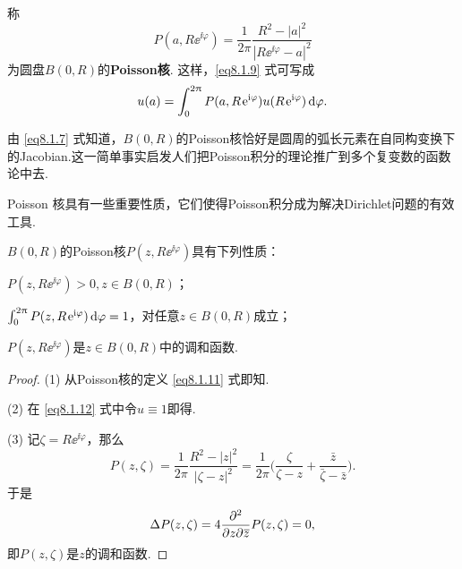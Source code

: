称
\begin{equation}\label{eq8.1.11}
  P(a,R\ee^{\ii\varphi}) = \frac1{2\pi}\frac{R^2-|a|^2}{|R\ee^{\ii\varphi}-a|^2}
\end{equation}
为圆盘$B(0,R)$的\textbf{Poisson核}. 这样，\eqref{eq8.1.9} 式可写成
\begin{equation}\label{eq8.1.12}
  u(a) = \int_0^{2\uppi}P(a,R\operatorname{\!\!\;\mathrm e}^{\mathrm i\varphi})u(R\operatorname{\!\!\;\mathrm e}^{\mathrm i\varphi})\mathop{}\!\mathrm{d} \varphi.
\end{equation}

由 \eqref{eq8.1.7} 式知道，$B(0,R)$的Poisson核恰好是圆周的弧长元素在自同构变换下的Jacobian.这一简单事实启发人们把Poisson积分的理论推广到多个复变数的函数论中去.

Poisson 核具有一些重要性质，它们使得Poisson积分成为解决Dirichlet问题的有效工具.

\begin{prop}\label{prop8.1.6}
  $B(0,R)$的Poisson核$P(z,R\ee^{\ii\varphi})$具有下列性质：
  \begin{eenum}
    \item \label{prop8.1.6.1} $P(z,R\ee^{\ii\varphi})>0,z\in B(0,R)$；
    \item \label{prop8.1.6.2} $\int_0^{2\uppi}P(z,R\operatorname{\!\!\;\mathrm e}^{\mathrm i\varphi})\mathop{}\!\mathrm{d} \varphi=1$，对任意$z\in B(0,R)$成立；
    \item \label{prop8.1.6.3} $P(z,R\ee^{\ii\varphi})$是$z\in B(0,R)$中的调和函数.
  \end{eenum}
\end{prop}
\begin{proof}(1) 从Poisson核的定义 \eqref{eq8.1.11} 式即知.

  (2) 在 \eqref{eq8.1.12} 式中令$u\equiv1$即得.

  (3) 记$\zeta=R\ee^{\ii\varphi}$，那么
  \[
    P(z,\zeta) = \frac1{2\pi}\frac{R^2-|z|^2}{|\zeta-z|^2} = \frac1{2\pi}
   \bigg(\frac\zeta{\zeta-z}+\frac{\bar z}{\bar \zeta-\bar z}\bigg).
  \]
  于是
  \[
    \Delta P(z,\zeta) = 4\frac{\partial^2 }{\partial z\partial {}\mkern1mu\overline{\mkern-1muz}}P(z,\zeta) = 0,
  \]
  即$P(z,\zeta)$是$z$的调和函数.
\end{proof}

